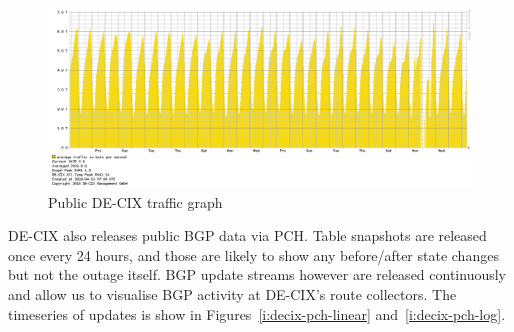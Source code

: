 \begin{figure}[tp]
  \centering
  \includegraphics[width=1\columnwidth]{images/traffic_FRA-1month-1170-400.png}
  \caption{Public DE-CIX traffic graph}
  \label{i:decix:public}
\end{figure}

DE-CIX also releases public BGP data via PCH. Table snapshots are released once
every 24 hours, and those are likely to show any before/after state changes but
not the outage itself. BGP update streams however are released continuously and
allow us to visualise BGP activity at DE-CIX's route collectors. The timeseries
of updates is show in Figures~\ref{i:decix-pch-linear}
and~\ref{i:decix-pch-log}.

\begin{figure}[tp]
\centering
{}

\end{figure}


